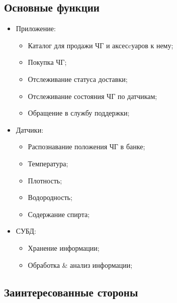 \documentclass[a4paper,8pt]{article}
\begin{document}
\subsection{Основные функции}

    \begin{itemize}
        \item Приложение:
            \begin{itemize}
                \item Каталог для продажи ЧГ и аксесcуаров к нему;
                \item Покупка ЧГ;
                \item Отслеживание статуса доставки;
                \item Отслеживание состояния ЧГ по датчикам;
                \item Обращение в службу поддержки;
            \end{itemize}
        \item Датчики:
            \begin{itemize}
                \item Распознавание положения ЧГ в банке;
                \item Температура;
                \item Плотность;
                \item Водородность;
                \item Содержание спирта;
            \end{itemize}
        \item СУБД:
            \begin{itemize}
                \item Хранение информации;
                \item Обработка \& анализ информации;
            \end{itemize}
    \end{itemize}



\subsection{Заинтересованные стороны}
\end{document}
